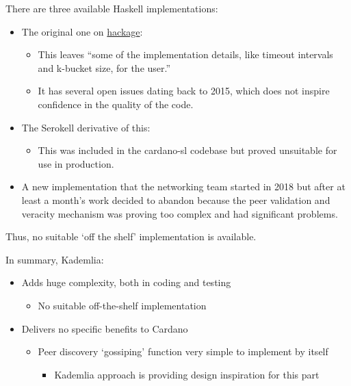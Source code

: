 \documentclass[11pt,a4paper]{article}
\begin{document}
There are three available Haskell implementations:

\begin{itemize}
\item
  The original one on
  \href{https://hackage.haskell.org/package/kademlia-1.1.0.0}{{hackage}}:

  \begin{itemize}
  \item
    This leaves ``some of the implementation details, like timeout
    intervals and k-bucket size, for the user.''
  \item
    It has several open issues dating back to 2015, which does not
    inspire confidence in the quality of the code.
  \end{itemize}
\item
  The Serokell derivative of this:

  \begin{itemize}
  \item
    This was included in the cardano-sl codebase but proved unsuitable
    for use in production.
  \end{itemize}
\item
  A new implementation that the networking team started in 2018 but
  after at least a month's work decided to abandon because the peer
  validation and veracity mechanism was proving too complex and had
  significant problems.
\end{itemize}

Thus, no suitable `off the shelf' implementation is available.

In summary, Kademlia:

\begin{itemize}
\item
  Adds huge complexity, both in coding and testing

  \begin{itemize}
  \item
    No suitable off-the-shelf implementation
  \end{itemize}
\item
  Delivers no specific benefits to Cardano

  \begin{itemize}
  \item
    Peer discovery `gossiping' function very simple to implement by
    itself

    \begin{itemize}
    \item
      Kademlia approach is providing design inspiration for this part
    \end{itemize}
  \end{itemize}
\end{itemize}
\end{document}
